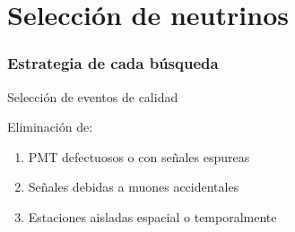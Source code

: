 \section[Selecci\'on $\nu$]{Selecci\'on de neutrinos}

\begin{frame}
 \frametitle{Estrategia de cada b\'usqueda}
 \begin{center}
 \end{center}
\end{frame}

\begin{frame}{Selecci\'on de eventos de calidad}
\begin{block}{Eliminaci\'on de:}
 \begin{enumerate}[<alert@+|+->]
  \item PMT defectuosos o con se\~nales espureas
  \item Se\~nales debidas a muones accidentales
  \item Estaciones aisladas espacial o temporalmente
 \end{enumerate}
\end{block}


\end{frame}
